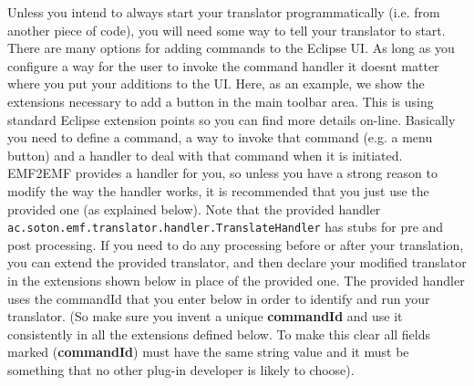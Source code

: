 Unless you intend to always start your translator programmatically (i.e. from another piece of code), you will need some way to tell your translator to start.
There are many options for adding commands to the Eclipse UI. As long as you configure a way for the user to invoke the command handler it doesnt matter where you put your additions to the UI. Here, as an example, we show the extensions necessary to add a button in the main toolbar area. This is using standard Eclipse extension points so you can find more details on-line. Basically you need to define a command, a way to invoke that command (e.g. a menu button) and a handler to deal with that command when it is initiated.
EMF2EMF provides a handler for you, so unless you have a strong reason to modify the way the handler works, it is recommended that you just use the provided one (as explained below). Note that the provided handler \texttt{ac.soton.emf.translator.handler.TranslateHandler} has stubs for pre and post processing. If you need to do any processing before or after your translation, you can extend the provided translator, and then declare your modified translator in the extensions shown below in place of the provided one. The provided handler uses the commandId that you enter below in order to identify and run your translator. (So make sure you invent a unique \textbf{commandId} and use it consistently in all the extensions defined below. To make this clear all fields marked (\textbf{commandId}) must have the same string value and it must be something that no other plug-in developer is likely to choose).


